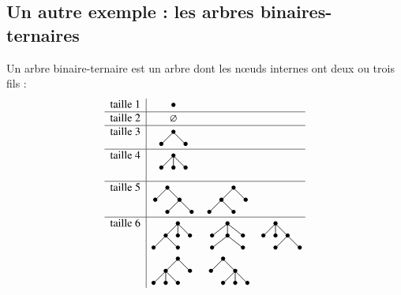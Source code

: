 \documentclass[12pt]{report}
\begin{document}
\subsection*{Un autre exemple : les arbres binaires-ternaires}
Un arbre binaire-ternaire est un arbre dont les nœuds internes ont deux ou trois fils : 
$$
\begin{array}{c|ccc}
  \text{taille 1} & \bullet&&\\
  \hline
  \text{taille 2} & \varnothing&&\\
  \hline
  \text{taille 3} & \xymatrix@R=5pt @C=5pt{& *={\bullet}  \ar@{-}[dl] \ar@{-}[dr] & \\ *={\bullet} & &*={\bullet}}&&\\
  \hline
  \text{taille 4} & \xymatrix@R=8pt @C=8pt{&  *={\bullet} \ar@{-}[dr] \ar@{-}[d] \ar@{-}[dl]&\\ *={\bullet}& *={\bullet} & *={\bullet}} &  &\\
&&&\\
 \hline 
 \text{taille 5} & \xymatrix@R=5pt @C=5pt{& *={\bullet} \ar@{-}[dr] \ar@{-}[dl]& &\\ *={\bullet} & & *={\bullet} \ar@{-}[dr] \ar@{-}[dl]& \\  & *={\bullet} & & *={\bullet}} 
 &\xymatrix@R=5pt @C=5pt{&& *={\bullet} \ar@{-}[dr] \ar@{-}[dl]&\\&*={\bullet}\ar@{-}[dr] \ar@{-}[dl]& & *={\bullet}  \\ *={\bullet} & & *={\bullet} &} & \\
 \hline
 \text{taille 6} & \xymatrix@R=8pt @C=8pt{ *={}&& *={\bullet} \ar@{-}[dl] \ar@{-}[d] \ar@{-}[dr]& \\*={} & *={\bullet} \ar@{-}[dl] \ar@{-}[dr] & *={\bullet} & *={\bullet}\\ *={\bullet} & *={}& *={\bullet} & }
 &\xymatrix@R=8pt @C=8pt{& *={\bullet} \ar@{-}[dl] \ar@{-}[d] \ar@{-}[dr]&\\ *={\bullet}  & *={\bullet}\ar@{-}[dl] \ar@{-}[dr] & *={\bullet}\\ *={\bullet} && *={\bullet} }
 & \xymatrix@R=8pt @C=8pt{ & *={\bullet} \ar@{-}[dl] \ar@{-}[d] \ar@{-}[dr]& &*={}\\ *={\bullet}  & *={\bullet} & *={\bullet}\ar@{-}[dl] \ar@{-}[dr]&*={} \\  &*={\bullet} & *={}& *={\bullet} }\\
 & \xymatrix@R=8pt @C=8pt{*={}& & *={\bullet}  \ar@{-}[dl] \ar@{-}[dr] & \\ *={}&*={\bullet}\ar@{-}[dl]\ar@{-}[d]\ar@{-}[dr] &*={} &*={\bullet}\\ *={\bullet}&*={\bullet}&*={\bullet} &}
 &\xymatrix@R=8pt @C=8pt{& *={\bullet}  \ar@{-}[dl] \ar@{-}[dr] & &*={}\\ *={\bullet} &*={} &*={\bullet}\ar@{-}[dl]\ar@{-}[d]\ar@{-}[dr] &*={}\\& *={\bullet}&*={\bullet}&*={\bullet} }&\\
\end{array}
$$
\end{document}
